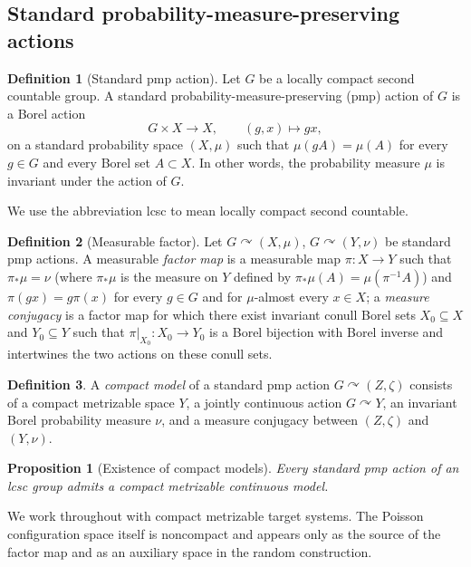 \documentclass[12pt]{amsart}
\newtheorem{proposition}[proposition]{Proposition}
\theoremstyle{definition}
\newtheorem{definition}[definition]{Definition}
\newcommand{\1}{\mathbf 1}
\begin{document}
\subsection{Standard probability-measure-preserving actions}
\begin{definition}[Standard pmp action]
	Let $G$ be a locally compact second countable group.
	A standard probability-measure-preserving (pmp) action of $G$ is a
	Borel action
	\[
	G\times X\to X,\qquad (g,x)\mapsto gx,
	\]
	on a standard probability space $(X,\mu)$ such that
$\mu(gA)=\mu(A)$
	for every $g\in G$ and every Borel set $A\subset X$.	
	In other words, the probability measure $\mu$ is invariant under the
	action of $G$.
\end{definition}
We use the abbreviation lcsc to mean locally compact second
countable.
\begin{definition}[Measurable factor]
	Let
	$G\curvearrowright(X,\mu)$,
	$G\curvearrowright(Y,\nu)$
	be standard pmp actions. A measurable \emph{factor map} is a measurable map
	$\pi:X\to Y$
	such that
$\pi_*\mu=\nu$ (where $\pi_*\mu$ is the measure on
$Y$ defined by $\pi_*\mu(A)=\mu (\pi^{-1}A)$)
	and
$\pi(gx)=g\pi(x)$
	for every $g\in G$ and for $\mu$-almost every $x\in X$; a \emph{measure conjugacy} is a factor map for which there exist invariant
	conull Borel sets $X_0\subseteq X$ and $Y_0\subseteq Y$ such that
	$\pi|_{X_0}:X_0\to Y_0$ is a Borel bijection with Borel inverse and
	intertwines the two actions on these conull sets.

\end{definition}

\begin{definition}
A \emph{compact model} of a standard pmp action $G\curvearrowright(Z,\zeta)$
consists of a compact metrizable space $Y$, a jointly continuous action
$G\curvearrowright Y$, an invariant Borel probability measure $\nu$, and a
measure conjugacy between $(Z,\zeta)$ and $(Y,\nu)$.
\end{definition}

\begin{proposition}[Existence of compact models]\label{prop:compact-model}\cite{Var63}
Every standard pmp action of an lcsc group admits a compact metrizable
continuous model.
\end{proposition}

We work throughout with compact metrizable target systems. The Poisson
configuration space itself is noncompact and appears only as the source of the
factor map and as an auxiliary space in the random construction.
\end{document}
